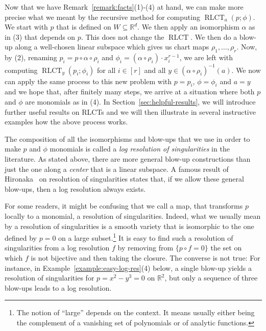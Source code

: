 \documentclass[11pt]{amsart}
\DeclareMathOperator{\rlct}{RLCT}
\numberwithin{equation}{section}
\theoremstyle{plain}
\theoremstyle{definition}
\newcommand{\R}{\mathbb{R}}
\begin{document}
Now that we have Remark~\ref{remark:facts}(1)-(4) at hand, we can make more precise what we meant by the recursive method for computing $\rlct_a(p;\phi)$. We start with $p$ that is defined on $W \subseteq \R^d$. We then apply an isomorphism $\alpha$ as in (3) that depends on $p$. This does not change the $\rlct$. We then do a blow-up along a well-chosen linear subspace which gives us chart maps $\rho_1,\ldots,\rho_r$. Now, by (2), renaming $p_i = p\circ\alpha \circ \rho_i$ and $\phi_i = (\alpha \circ \rho_i) \cdot x_i^{r-1}$, we are left with computing $\rlct_y(p_i; \phi_i) $ for all $i \in [r]$ and all $y \in (\alpha \circ \rho_i)^{-1}(a)$. We now can apply the same process to this new problem with $p = p_i$, $\phi = \phi_i$ and $a = y$ and we hope that, after finitely many steps, we arrive at a situation where both $p$ and $\phi$ are monomials as in (4). In Section~\ref{sec:helpful-results}, we will introduce further useful results on RLCTs and we will then illustrate in several instructive examples how the above process works.

The composition of all the isomorphisms and blow-ups that we use in order to make $p$ and $\phi$ monomials is called a \emph{log resolution of singularities} in the literature. As stated above, there are more general blow-up constructions than just the one along a \emph{center} that is a linear subspace. A famous result of Hironaka~\cite{Hironaka1964Resolution} on resolution of singularities states that, if we allow these general blow-ups, then a log resolution always exists. 

For some readers, it might be confusing that we call a map, that transforms $p$ locally to a monomial, a resolution of singularities. Indeed, what we usually mean by a resolution of singularities is a smooth variety that is isomorphic to the one defined by $p = 0$ on a large subset.\footnote{The notion of ``large'' depends on the context. It means usually either being the complement of a vanishing set of polynomials or of analytic functions.} It is easy to find such a resolution of singularities from a log resolution $f$ by removing from $\{p\circ f = 0\}$ the set on which $f$ is not bijective and then taking the closure. The converse is not true: For instance, in Example~\ref{example:easy-log-res}(4) below, a single blow-up yields a resolution of singularities for $p = x^2 - y^3 = 0$ on $\R^2$, but only a sequence of three blow-ups leads to a log resolution.
\end{document}
